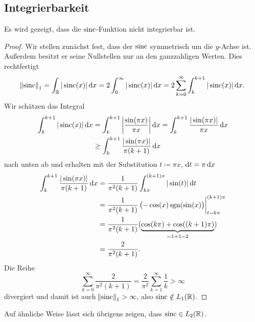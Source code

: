 \subsection{Integrierbarkeit}
Es wird gezeigt, dass die $ \operatorname{sinc} $-Funktion nicht integrierbar ist.
\begin{proof}
Wir stellen zunächst fest, dass der $ \operatorname{sinc} $ symmetrisch um die $ y $-Achse ist. Außerdem besitzt
er seine Nullstellen nur an den ganzzahligen Werten. Dies rechtfertigt
\[
    \norm{\sinc}_{1}
  = \int_{\R} |\sinc(x)| \dif x
  = 2 \int_{0}^{\infty} |\sinc(x)| \dif x
  = 2 \sum_{k = 0}^{\infty} \int_{k}^{k + 1} |\sinc(x)| \dif x.
\]
Wir schätzen das Integral
\begin{align*}
    \int_{k}^{k + 1} |\sinc(x)| \dif x
 &= \int_{k}^{k + 1} \left| \frac{\sin(\pi x)}{\pi x} \right|  \dif x
  = \int_{k}^{k + 1} \frac{|\sin(\pi x)|}{\pi x} \dif x \\
 &\geq \int_{k}^{k + 1} \frac{|\sin(\pi x)|}{\pi(k + 1)} \dif x
\end{align*}
nach unten ab und erhalten mit der Substitution $ t \coloneqq \pi x $, $ \dif t = \pi \dif x $
\begin{align*}
   \int_{k}^{k + 1} \frac{|\sin(\pi x)|}{\pi(k + 1)} \dif x
&= \frac{1}{\pi^{2}(k + 1)} \int_{k\pi}^{(k + 1)\pi} |\sin(t)| \dif t \\
&= \frac{1}{\pi^{2}(k + 1)} 
      \eval[3]{ \left( -\cos(x) \sgn(\sin(x) \right) }_{t = k\pi}^{(k + 1)\pi} \\
&= \frac{1}{\pi^{2}(k + 1)} (\underbrace{\cos(k\pi) + \cos((k + 1)\pi)}_{= 1 + 1 = 2})\\
&= \frac{2}{\pi^{2}(k + 1)}.
\end{align*}
Die Reihe
\[
    \sum_{k = 0}^{\infty} \frac{2}{\pi^{2}(k + 1)}
  = \frac{2}{\pi^{2}} \sum_{k = 1}^{\infty} \frac{1}{k}
  > \infty
\]
divergiert und damit ist auch $ \norm{\operatorname{sinc}}_{1} > \infty $, also $ \operatorname{sinc} \notin L_{1}(\mathbb{R}) $.
\end{proof}
Auf ähnliche Weise lässt sich übrigens zeigen, dass $ \operatorname{sinc} \in L_{2}(\mathbb{R}) $.

